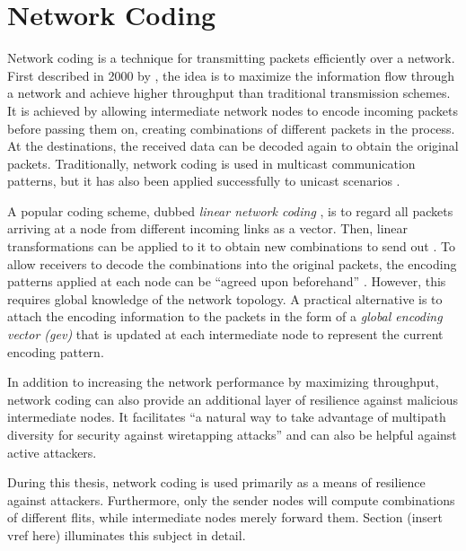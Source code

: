 \section{Network Coding}\label{sec:networkcodingfun}
Network coding is a technique for transmitting packets efficiently over a network. First described in 2000 by \citeauthor{ahlswede00networkflow}
\cite{ahlswede00networkflow}, the idea is to maximize the information flow through a network and achieve higher throughput than traditional transmission
schemes. It is achieved by allowing intermediate network nodes to encode incoming packets before passing them on, creating combinations of different
packets in the process. At the destinations, the received data can be decoded again to obtain the original packets. Traditionally, network coding is
used in multicast communication patterns, but it has also been applied successfully to unicast scenarios \cite[e.g.][]{moriam15manycorenc}.

A popular coding scheme, dubbed \textit{linear network coding} \cite{li03linearnc}, is to regard all packets arriving at a node from different incoming links as a vector.
Then, linear transformations can be applied to it to obtain new combinations to send out \cite[1]{li03linearnc}. To allow receivers to decode the
combinations into the original packets, the encoding patterns applied at each node can be \enquote{agreed upon beforehand} \cite[1]{li03linearnc}.
However, this requires global knowledge of the network topology. A practical alternative is to attach the encoding information to the packets in the
form of a \textit{global encoding vector (\gls{gev})} \cites[2\psqq]{chou03practicalnc}[5\psq]{chou07ncforinternetandwireless} that is updated at each intermediate node to
represent the current encoding pattern.

In addition to increasing the network performance by maximizing throughput, network coding can also provide an additional layer of resilience against
malicious intermediate nodes. It facilitates \enquote{a natural way to take advantage of multipath diversity for security against wiretapping attacks}
\cite[8]{fragouli07ncfundamentals} and can also be helpful against active attackers.

During this thesis, network coding is used primarily as a means of resilience against attackers. Furthermore, only the sender nodes will compute
combinations of different flits, while intermediate nodes merely forward them. Section (insert vref here) illuminates this subject in detail.
